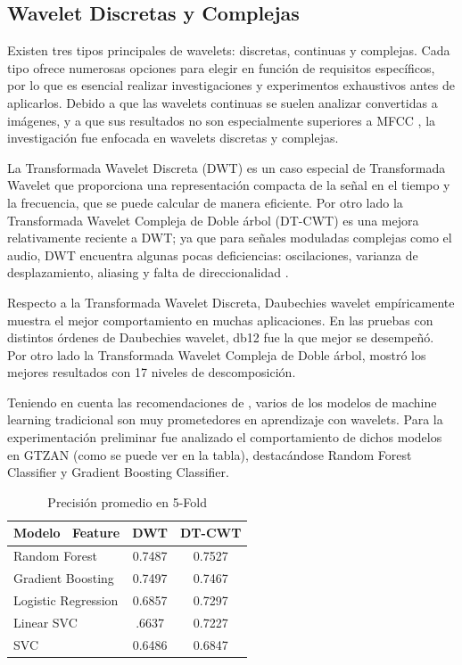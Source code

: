 \documentclass[colorinlistoftodos,twoside,twocolumn,10pt]{article} %
\begin{document}
\subsection {Wavelet Discretas y Complejas}
Existen tres tipos principales de wavelets: discretas, continuas y complejas. Cada tipo ofrece numerosas opciones para elegir en funci\'on de requisitos espec\'ificos, por lo que es esencial realizar investigaciones y experimentos exhaustivos antes de aplicarlos.
Debido a que las wavelets continuas se suelen analizar convertidas a im\'agenes, y a que sus resultados no son especialmente superiores a MFCC \cite{Wavelet Transform for Music Genre Classification}, la investigación fue enfocada en wavelets discretas y complejas. 

La Transformada Wavelet Discreta (DWT) \cite{wavelet transform in machine learning} es un caso especial de Transformada Wavelet que proporciona una representaci\'on compacta de la se\~nal en el tiempo y la frecuencia, que se puede calcular de manera eficiente\cite{Musical Genre Classification Of Audio Signals}. Por otro lado  la Transformada Wavelet Compleja de Doble \'arbol (DT-CWT) \cite{DT-CWT} es una mejora relativamente reciente a DWT; ya que para se\~nales moduladas complejas como el audio, DWT encuentra algunas pocas deficiencias: oscilaciones, varianza de desplazamiento, aliasing y falta de direccionalidad \cite{Wavelet Transform for Music Genre Classification}.

Respecto a la Transformada Wavelet Discreta, Daubechies wavelet  emp\'iricamente muestra el mejor comportamiento en muchas aplicaciones\cite{Wavelet Transform for Music Genre Classification}. En las pruebas con distintos \'ordenes de Daubechies wavelet, db12 fue la que mejor se desempe\~n\'o. Por otro lado la Transformada Wavelet Compleja de Doble \'arbol, mostr\'o los mejores resultados con 17 niveles de descomposici\'on.

Teniendo en cuenta las recomendaciones de \cite{wavelet transform in machine learning}, varios de los modelos de machine learning tradicional son muy prometedores en aprendizaje con wavelets. Para la experimentaci\'on preliminar fue analizado el comportamiento de dichos modelos en GTZAN (como se puede ver en la tabla), destac\'andose Random Forest Classifier y Gradient Boosting Classifier.

\begin{table}[htbp]
\centering
\begin{tabular}{|l||c|c|}
\hline Modelo \ Feature & DWT & DT-CWT\\ %
\hline\hline Random Forest & 0.7487 & 0.7527 \\ 
\hline Gradient Boosting & 0.7497 & 0.7467 \\ %
\hline Logistic Regression & 0.6857 & 0.7297 \\ %
\hline Linear SVC & .6637 & 0.7227 \\ 
\hline SVC & 0.6486 & 0.6847 \\ %
\hline
\end{tabular}%
\caption{Precisión promedio en 5-Fold} 
\label{tabla:2}%
\end{table}
\end{document}
